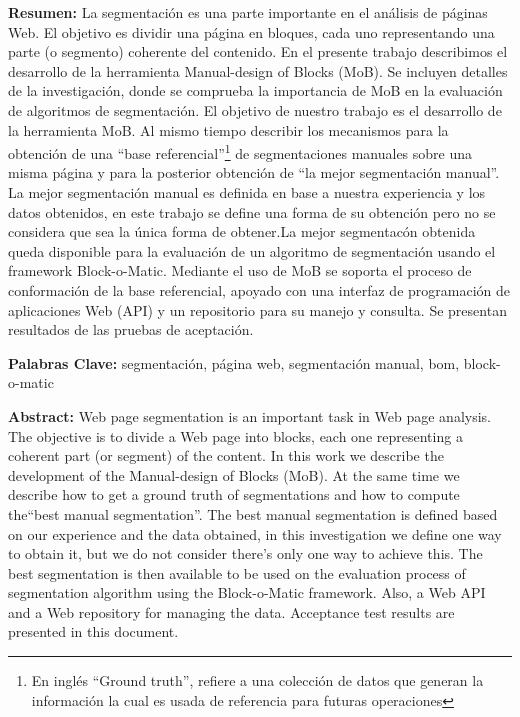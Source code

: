 \documentclass[10pt]{revecom}
\begin{document}
\begin{@twocolumnfalse}
\begin{center}
\begin{minipage}{0.95\textwidth}
\textbf{Resumen:} 
La segmentación es una parte importante en el análisis de páginas Web. 
El objetivo es dividir una página en bloques, cada uno representando una parte (o segmento) coherente del contenido.
%
En el presente trabajo describimos el desarrollo de la herramienta Manual-design of Blocks (MoB).
Se incluyen detalles de la investigación, donde se comprueba la importancia de MoB en la evaluación de algoritmos de segmentación. 
El objetivo de nuestro trabajo es el desarrollo de la herramienta MoB. Al mismo tiempo describir los mecanismos para la obtención de una ``base referencial''\footnote{En inglés ``Ground truth'', refiere a una colección de datos que generan la información la cual es usada de referencia para futuras operaciones} de segmentaciones manuales sobre una misma página y para la posterior obtención de ``la mejor segmentación manual''. 
La mejor segmentación manual es definida en base a nuestra experiencia y los datos obtenidos, en este trabajo se define una forma de su obtención pero no se considera que sea la única forma de obtener.La mejor segmentacón obtenida queda disponible para la evaluación de un algoritmo de segmentación usando el framework Block-o-Matic. 
Mediante el uso de MoB se soporta el proceso de conformación de la base referencial, apoyado con una interfaz de programación de aplicaciones Web (API) y un repositorio para su manejo y consulta.
Se presentan resultados de las pruebas de aceptación. 
\nextpar

\textbf{Palabras Clave:} segmentación, página web, segmentación manual, bom, block-o-matic
\nextpar

\textbf{Abstract:} 
Web page segmentation is an important task in Web page analysis. The objective is to divide a Web page into blocks, each one representing a coherent part (or segment) of the content. 
In this work we describe the development of the Manual-design of Blocks (MoB). At the same time we describe how to get a ground truth of segmentations and how to compute the``best manual segmentation''.
The best manual segmentation is defined based on our experience and the data obtained, in this investigation we define one way to obtain it, but we do not consider there's only one way to achieve this. The best segmentation is then available to be used on the evaluation process of segmentation algorithm using the Block-o-Matic framework. 
Also, a Web API and a Web repository for managing the data.
Acceptance test results are presented in this document.
\nextpar


\end{minipage}
\end{center}
\end{@twocolumnfalse}
\end{document}
